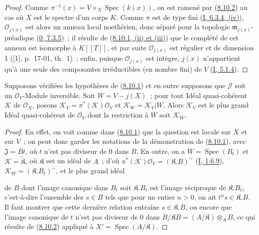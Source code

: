 \begin{proof}
Comme $\pi^{-1}(x)=V\times_X\operatorname{Spec}(k(x))$, on est ramené par
(\hyperref[II.8.10.2-fr]{8.10.2}) au cas où $X$ est le spectre d'un corps
$K$. Comme $\pi$ est de type fini
(\hyperref[I.6.3.4-fr]{I, 6.3.4, (iv)}), $\mathcal{O}_{j(x)}$ est alors un
anneau local noethérien, donc séparé pour la topologie
$\mathfrak{m}_{j(x)}$-préadique
(\hyperref[0.7.3.5-fr]{0, 7.3.5})~; il résulte de
(\hyperref[II.8.10.1-fr]{8.10.1, (ii) et (iii)}) que le complété de cet anneau
est isomorphe à $K[[T]]$, et par suite $\mathcal{O}_{j(x)}$ est régulier et de
dimension 1 ([1], p.~17-01, th.~1)~; enfin, puisque $\mathcal{O}_{j(x)}$ est
intègre, $j(x)$ n'appartient qu'à une seule des composantes irréductibles (en
nombre fini) de $V$ (\hyperref[I.5.1.4-fr]{I, 5.1.4}).
\end{proof}

\begin{corollary}[8.10.4]
\label{II.8.10.4-fr}
Supposons vérifiées les hypothèses de (\hyperref[II.8.10.1-fr]{8.10.1}) et en
outre supposons que $\mathcal{J}$ soit un $\mathcal{O}_V$-Module inversible.
Soit $W=V-j(X)$~; pour tout Idéal quasi-cohérent $\mathcal{K}$ de
$\mathcal{O}_X$, posons
$\mathcal{K}_V=\pi^*(\mathcal{K})\mathcal{O}_V$ et
$\mathcal{K}_W=\mathcal{K}_V|W$. Alors $\mathcal{K}_V$ est le plus grand
Idéal quasi-cohérent de $\mathcal{O}_V$ dont la restriction à $W$ soit
$\mathcal{K}_W$.
\end{corollary}

\begin{proof}
En effet, on voit comme dans (\hyperref[II.8.10.1-fr]{8.10.1}) que la question
est locale sur $X$ et sur $V$~; on peut donc garder les notations de la
démonstration de (\hyperref[II.8.10.1-fr]{8.10.1}), avec
$\mathfrak{J}=Bt$, où $t$ n'est pas diviseur de 0 dans $B$. En outre, on a
$W=\operatorname{Spec}(B_t)$ et $\mathcal{K}=\widetilde{\mathfrak{K}}$, où
$\mathfrak{K}$ est un idéal de $A$~; d'où
$\pi^*(\mathcal{K})\mathcal{O}_V=(\mathfrak{K}.B)^{\sim}$
(\hyperref[I.1.6.9-fr]{I, 1.6.9}),
$\mathcal{K}_W=(\mathfrak{K}.B_t)^{\sim}$, et le plus grand idéal

de $B$ dont l'image canonique dans $B_t$ soit $\mathfrak{K}.B_t$ est l'image
réciproque de $\mathfrak{K}.B_t$, c'est-à-dire l'ensemble des $s\in B$ tels
que pour un entier $n>0$, on ait $t^ns\in\mathfrak{K}.B$. Il faut montrer que
cette dernière relation entraîne $s\in\mathfrak{K}.B$, ou encore que l'image
canonique de $t$ n'est pas diviseur de 0 dans
$B/\mathfrak{K}B=(A/\mathfrak{K})\otimes_A B$, ce qui résulte de
(\hyperref[II.8.10.2-fr]{8.10.2}) appliqué à
$X'=\operatorname{Spec}(A/\mathfrak{K})$.
\end{proof}

